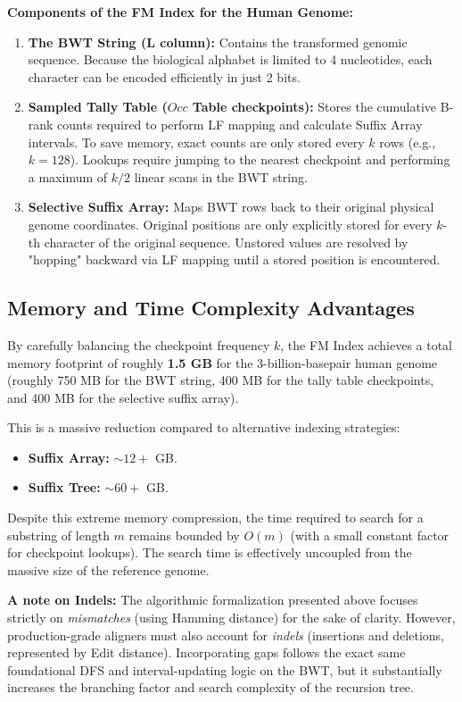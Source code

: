 \begin{important}
    \textbf{Components of the FM Index for the Human Genome:}
    \begin{enumerate}
        \item \textbf{The BWT String (L column):} Contains the transformed genomic sequence. Because the biological alphabet is limited to 4 nucleotides, each character can be encoded efficiently in just 2 bits.
        \item \textbf{Sampled Tally Table ($Occ$ Table checkpoints):} Stores the cumulative B-rank counts required to perform LF mapping and calculate Suffix Array intervals. To save memory, exact counts are only stored every $k$ rows (e.g., $k=128$). Lookups require jumping to the nearest checkpoint and performing a maximum of $k/2$ linear scans in the BWT string.
        \item \textbf{Selective Suffix Array:} Maps BWT rows back to their original physical genome coordinates. Original positions are only explicitly stored for every $k$-th character of the original sequence. Unstored values are resolved by "hopping" backward via LF mapping until a stored position is encountered.
    \end{enumerate}
\end{important}

\subsection{Memory and Time Complexity Advantages}
By carefully balancing the checkpoint frequency $k$, the FM Index achieves a total memory footprint of roughly \textbf{1.5 GB} for the 3-billion-basepair human genome (roughly 750 MB for the BWT string, 400 MB for the tally table checkpoints, and 400 MB for the selective suffix array).

This is a massive reduction compared to alternative indexing strategies:
\begin{itemize}
    \item \textbf{Suffix Array:} $\sim 12+$ GB.
    \item \textbf{Suffix Tree:} $\sim 60+$ GB.
\end{itemize}
Despite this extreme memory compression, the time required to search for a substring of length $m$ remains bounded by $O(m)$ (with a small constant factor for checkpoint lookups). The search time is effectively uncoupled from the massive size of the reference genome.

\sta \textbf{A note on Indels:} The algorithmic formalization presented above focuses strictly on \textit{mismatches} (using Hamming distance) for the sake of clarity. However, production-grade aligners must also account for \textit{indels} (insertions and deletions, represented by Edit distance). Incorporating gaps follows the exact same foundational DFS and interval-updating logic on the BWT, but it substantially increases the branching factor and search complexity of the recursion tree.
